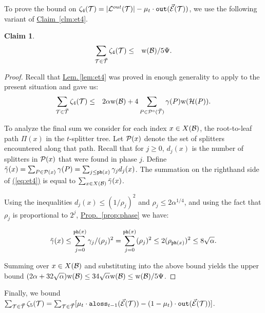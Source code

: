 \documentclass{acmsmall}
\newtheorem{claim}[theorem]{Claim}
\newcommand{\cB}{{\cal B}}
\newcommand{\cE}{{\cal E}}
\newcommand{\cH}{{\cal H}}
\newcommand{\cL}{{\cal L}}
\newcommand{\cP}{{\cal P}}
\newcommand{\cT}{{\cal T}}
\newcommand{\Eqn}[1]{\hyperref[eq:#1]{(\ref*{eq:#1})}} %
\newcommand{\Lem}[1]{\hyperref[lem:#1]{Lem.\,\ref*{lem:#1}}} %
\newcommand{\Prop}[1]{\hyperref[prop:#1]{Prop.~\ref*{prop:#1}}} %
\newcommand{\Clm}[1]{\hyperref[clm:#1]{Claim~\ref*{clm:#1}}} %
\newcommand{\aloss}{{\tt aloss}}
\newcommand{\outside}{{\tt out}}
\newcommand{\phase}{{\tt ph}}
\newcommand{\width}{{\bf {\rm  w}}}
\newcommand{\gridprec}{\alpha}
\newcommand{\errorcont}{\Psi}
\newcommand{\errorterm}{\zeta}
\begin{document}
To prove the bound on  $\errorterm_4(\cT) = |\cL^{out}(\cT)| - \mu_t \cdot \outside(\vec{\cE}(\cT))$, 
we use the
following variant of \Clm{et4}. 

\begin{claim}
\label{clm:et4imp}
\begin{eqnarray*}
\sum_{\cT \in \vec{\cT}} \errorterm_4 (\cT)& \leq & \width(\cB)/5\errorcont.
\end{eqnarray*}
\end{claim}

\begin{proof}
Recall that \Lem{et4} was proved in enough generality to apply to the present situation and gave us:
\begin{eqnarray}
\label{eq:et4}
\sum_{\cT \in \vec{\cT}} \errorterm_4(\cT) & \leq & 2\gridprec \width(\cB) + 4\sum_{P \in \cP^{\circ}(\vec{\cT})}\gamma(P)\width(\cH(P)).
\end{eqnarray}

To analyze the final sum we consider for each index $x \in X(\cB)$, the root-to-leaf path $\Pi(x)$ in the $t$-splitter tree.  Let $\cP(x)$ denote the
set of splitters encountered along that path.  Recall that for $j \geq 0$, $d_j(x)$ is the number of splitters in $\cP(x)$
that were found in phase $j$. Define 
$\tilde{\gamma}(x)=\sum_{P \in \cP(x)} \gamma(P)=\sum_{j \leq \phase(x)} \gamma_jd_j(x)$.  
The summation on the righthand side
of \Eqn{et4} is equal to $\sum_{x \in X(\cB)} \tilde{\gamma}(x)$.


Using the inequalities $d_j(x) \leq (1/\rho_j)^2$ and $\rho_j \leq 2\gridprec^{1/4}$, and using the
fact that $\rho_j$ is proportional to $2^j$,
\Prop{phase} we have:

\begin{equation*}
\tilde{\gamma}(x) \leq \sum_{j = 0}^{\phase(x)} \gamma_j/(\rho_j)^2=\sum_{j=0}^{\phase(x)} (\rho_j )^2 \leq 2 (\rho_{\phase(x)})^2 \leq 8\sqrt{\gridprec}.
\end{equation*}

Summing over $x \in X(\cB)$  and substituting into the above bound yields the upper bound 
$(2\gridprec+32\sqrt{\gridprec})\width(\cB) \leq 34\sqrt{\gridprec}\width(\cB) \leq \width(\cB)/5\errorcont$.
\end{proof}


Finally, we bound $\sum_{\cT \in \vec{\cT}}\errorterm_5(\cT) = \sum_{\cT \in \vec{\cT}}
[\mu_t\cdot\aloss_{t-1}(\vec{\cE}(\cT)) - (1-\mu_t)\cdot \outside(\vec{\cE}(\cT))]$.
%
\end{document}
